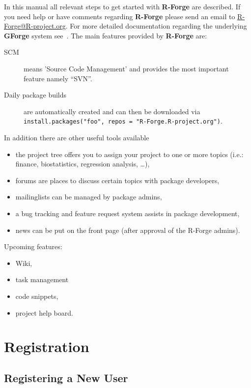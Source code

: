 \documentclass[a4paper]{report}
\let\code=\texttt
\begin{document}
In this manual all relevant steps to get
started with \textbf{R-Forge} are described. If you need help or have
comments regarding \textbf{R-Forge} please send an email to
\url{R-Forge@R-project.org}. For more detailed
documentation regarding the underlying \textbf{GForge} system
see~\cite{forge:copeland_et_al:2006}.\newline 
\newline
The main features provided by \textbf{R-Forge} are:
\begin{description}
\item[SCM] means 'Source Code Management' and provides the most
  important feature namely ``SVN''.
\item[Daily package builds] are automatically created and can then be
  downloaded via\newline 
  \code{install.packages("foo", repos = "R-Forge.R-project.org")}.
\end{description}
In addition there are other useful tools available
\begin{itemize}
\item the project tree offers you to assign your project to one or more
  topics (i.e.: finance, biostatistics, regression analysis, \ldots),
\item forums are places to discuss certain topics with package
  developers,
\item mailinglists can be managed by package admins,
\item a bug tracking and feature request system assists in package
  development,
\item news can be put on the front page (after approval of the R-Forge
  admins).
\end{itemize}
Upcoming features:
\begin{itemize}
\item Wiki,
\item task management
\item code snippets,
\item project help board.
\end{itemize}

\section{Registration}
\label{sec:registration}

\subsection{Registering a  New User}
\end{document}
